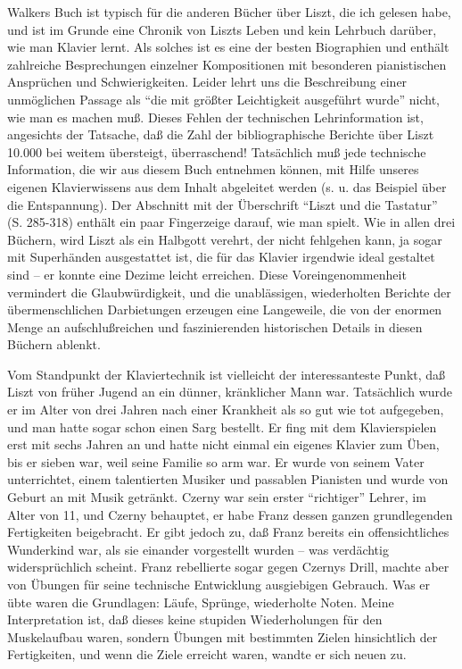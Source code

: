 Walkers Buch ist typisch für die anderen Bücher über Liszt, die ich gelesen habe, und ist im Grunde eine Chronik von Liszts Leben und kein Lehrbuch darüber, wie man Klavier lernt.
Als solches ist es eine der besten Biographien und enthält zahlreiche Besprechungen einzelner Kompositionen mit besonderen pianistischen Ansprüchen und Schwierigkeiten.
Leider lehrt uns die Beschreibung einer unmöglichen Passage als \enquote{die mit größter Leichtigkeit ausgeführt wurde} nicht, wie man es machen muß.
Dieses Fehlen der technischen Lehrinformation ist, angesichts der Tatsache, daß die Zahl der bibliographische Berichte über Liszt 10.000 bei weitem übersteigt, überraschend!
Tatsächlich muß jede technische Information, die wir aus diesem Buch entnehmen können, mit Hilfe unseres eigenen Klavierwissens aus dem Inhalt abgeleitet werden (s. u. das Beispiel über die Entspannung).
Der Abschnitt mit der Überschrift \enquote{Liszt und die Tastatur} (S. 285-318) enthält ein paar Fingerzeige darauf, wie man spielt.
Wie in allen drei Büchern, wird Liszt als ein Halbgott verehrt, der nicht fehlgehen kann, ja sogar mit Superhänden ausgestattet ist, die für das Klavier irgendwie ideal gestaltet sind -- er konnte eine Dezime leicht erreichen.
Diese Voreingenommenheit vermindert die Glaubwürdigkeit, und die unablässigen, wiederholten Berichte der übermenschlichen Darbietungen erzeugen eine Langeweile, die von der enormen Menge an aufschlußreichen und faszinierenden historischen Details in diesen Büchern ablenkt.

Vom Standpunkt der Klaviertechnik ist vielleicht der interessanteste Punkt, daß Liszt von früher Jugend an ein dünner, kränklicher Mann war.
Tatsächlich wurde er im Alter von drei Jahren nach einer Krankheit als so gut wie tot aufgegeben, und man hatte sogar schon einen Sarg bestellt.
Er fing mit dem Klavierspielen erst mit sechs Jahren an und hatte nicht einmal ein eigenes Klavier zum Üben, bis er sieben war, weil seine Familie so arm war.
Er wurde von seinem Vater unterrichtet, einem talentierten Musiker und passablen Pianisten und wurde von Geburt an mit Musik getränkt.
Czerny war sein erster \enquote{richtiger} Lehrer, im Alter von 11, und Czerny behauptet, er habe Franz dessen ganzen grundlegenden Fertigkeiten beigebracht.
Er gibt jedoch zu, daß Franz bereits ein offensichtliches Wunderkind war, als sie einander vorgestellt wurden -- was verdächtig widersprüchlich scheint.
Franz rebellierte sogar gegen Czernys Drill, machte aber von Übungen für seine technische Entwicklung ausgiebigen Gebrauch.
Was er übte waren die Grundlagen: Läufe, Sprünge, wiederholte Noten.
Meine Interpretation ist, daß dieses keine stupiden Wiederholungen für den Muskelaufbau waren, sondern Übungen mit bestimmten Zielen hinsichtlich der Fertigkeiten, und wenn die Ziele erreicht waren, wandte er sich neuen zu.

